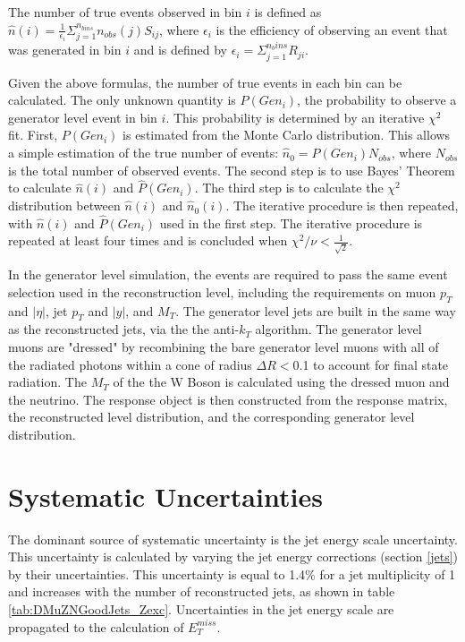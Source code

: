 \documentclass[oneside, letterpaper, oldfontcommands]{memoir}
\begin{document}
\begin{table}
\qquad The number of true events observed in bin $i$ is defined as $\hat{n}(i) = \frac{1}{\epsilon_{i}}\Sigma_{j=1}^{n_{bins}}n_{obs}(j)S_{ij}$, where $\epsilon_{i}$ is the efficiency of observing an event that was generated in bin $i$ and is defined by $\epsilon_{i}=\Sigma_{j=1}^{n_bins}R_{ji}$.

\qquad Given the above formulas, the number of true events in each bin can be calculated. The only unknown quantity is $P(Gen_{i})$, the probability to observe a generator level event in bin $i$. This probability is determined by an iterative $\chi^2$ fit. First, $P(Gen_{i})$ is estimated from the Monte Carlo distribution. This allows a simple estimation of the true number of events: $\hat{n}_{0} = P(Gen_{i})N_{obs}$, where $N_{obs}$ is the total number of observed events. The second step is to use Bayes' Theorem to calculate $\hat{n}(i)$ and $\hat{P}(Gen_{i})$. The third step is to calculate the $\chi^{2}$ distribution between $\hat{n}(i)$ and $\hat{n}_{0}(i)$. The iterative procedure is then repeated, with $\hat{n}(i)$ and $\hat{P}(Gen_{i})$ used in the first step. The iterative procedure is repeated at least four times and is concluded when $\chi^{2}/\nu < \frac{1}{\sqrt{2}}$.

\qquad In the generator level simulation, the events are required to pass the same event selection used in the reconstruction level, including the requirements on muon $p_{T}$ and $|\eta|$, jet $p_{T}$ and $|y|$, and $M_{T}$. The generator level jets are built in the same way as the reconstructed jets, via the the anti-$k_{T}$ algorithm. The generator level muons are "dressed" by recombining the bare generator level muons with all of the radiated photons within a cone of radius $\Delta R <$0.1 to account for final state radiation. The $M_{T}$ of the the W Boson is calculated using the dressed muon and the neutrino. The response object is then constructed from the response matrix, the reconstructed level distribution, and the corresponding generator level distribution. 

\section{Systematic Uncertainties}

\qquad The dominant source of systematic uncertainty is the jet energy scale uncertainty. This uncertainty is calculated by varying the jet energy corrections (section \ref{jets}) by their uncertainties. This uncertainty is equal to 1.4\% for a jet multiplicity of 1 and increases with the number of reconstructed jets, as shown in table \ref{tab:DMuZNGoodJets_Zexc}. Uncertainties in the jet energy scale are propagated to the calculation of $E_{T}^{miss}$.


\end{table}
\end{document}
